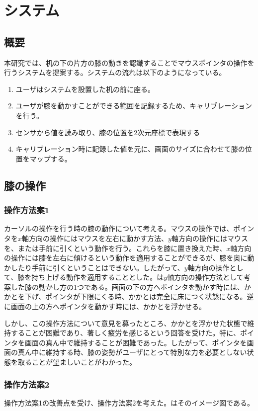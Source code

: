 \chapter{システム}
\section{概要}
本研究では、机の下の片方の膝の動きを認識することでマウスポインタの操作を行うシステムを提案する。システムの流れは以下のようになっている。
\begin{enumerate}
	\item ユーザはシステムを設置した机の前に座る。
	\item ユーザが膝を動かすことができる範囲を記録するため、キャリブレーションを行う。
	\item センサから値を読み取り、膝の位置を2次元座標で表現する
	\item キャリブレーション時に記録した値を元に、画面のサイズに合わせて膝の位置をマップする。
\end{enumerate}
\section{膝の操作}
\subsection{操作方法案1}
カーソルの操作を行う時の膝の動作について考える。マウスの操作では、ポインタを$x$軸方向の操作にはマウスを左右に動かす方法、$y$軸方向の操作にはマウスを、または手前に引くという動作を行う。これらを膝に置き換えた時、$x$軸方向の操作には膝を左右に傾けるという動作を適用することができるが、膝を奥に動かしたり手前に引くということはできない。したがって、$y$軸方向の操作として、膝を持ち上げる動作を適用することとした。は$y$軸方向の操作方法として考案した膝の動かし方の1つである。画面の下の方へポインタを動かす時には、かかとを下げ、ポインタが下限にくる時、かかとは完全に床につく状態になる。逆に画面の上の方へポインタを動かす時には、かかとを浮かせる。


しかし、この操作方法について意見を募ったところ、かかとを浮かせた状態で維持することが困難であり、著しく疲労を感じるという回答を受けた。特に、ポインタを画面の真ん中で維持することが困難であった。したがって、ポインタを画面の真ん中に維持する時、膝の姿勢がユーザにとって特別な力を必要としない状態を取ることが望ましいことがわかった。
\subsection{操作方法案2}
操作方法案1の改善点を受け、操作方法案2を考えた。はそのイメージ図である。

